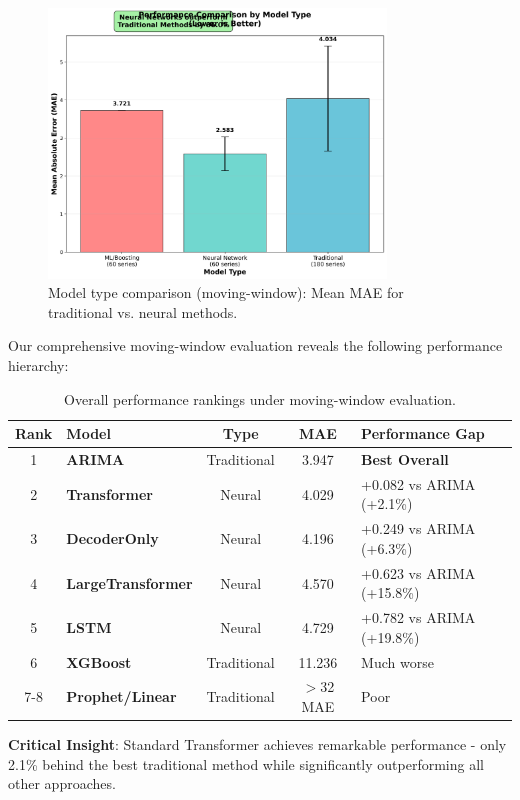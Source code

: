 \documentclass[11pt]{article}
\begin{document}
\begin{figure}[h]
\centering
\includegraphics[width=0.8\textwidth]{../results/figure4_model_type_comparison.png}
\caption{Model type comparison (moving-window): Mean MAE for traditional vs. neural methods.}
\label{fig:model_type}
\end{figure}



Our comprehensive moving-window evaluation reveals the following performance hierarchy:

\begin{table}[h]
\centering
\begin{tabular}{@{}clccl@{}}
\toprule
Rank & Model & Type & MAE & Performance Gap \\
\midrule
1 & \textbf{ARIMA} & Traditional & 3.947 & \textbf{Best Overall} \\
2 & \textbf{Transformer} & Neural & 4.029 & +0.082 vs ARIMA (+2.1\%) \\
3 & \textbf{DecoderOnly} & Neural & 4.196 & +0.249 vs ARIMA (+6.3\%) \\
4 & \textbf{LargeTransformer} & Neural & 4.570 & +0.623 vs ARIMA (+15.8\%) \\
5 & \textbf{LSTM} & Neural & 4.729 & +0.782 vs ARIMA (+19.8\%) \\
6 & \textbf{XGBoost} & Traditional & 11.236 & Much worse \\
7-8 & \textbf{Prophet/Linear} & Traditional & $>$32 MAE & Poor \\
\bottomrule
\end{tabular}
\caption{Overall performance rankings under moving-window evaluation.}
\end{table}

\textbf{Critical Insight}: Standard Transformer achieves remarkable performance - only 2.1\% behind the best traditional method while significantly outperforming all other approaches.
\end{document}
